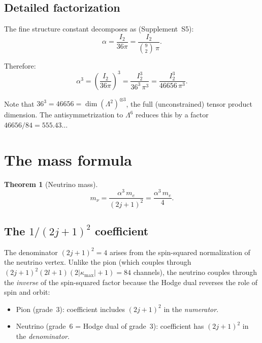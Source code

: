 \documentclass[11pt,letterpaper]{article}
\newtheorem{theorem}{Theorem}[section]
\numberwithin{equation}{section}
\begin{document}
\subsection{Detailed factorization}

The fine structure constant decomposes as (Supplement~S5):
\begin{equation}
  \alpha = \frac{I_2}{36\pi} = \frac{I_2}{\binom{9}{2}\,\pi}.
\end{equation}

Therefore:
\begin{equation}
\label{eq:alpha3}
  \alpha^3 = \left(\frac{I_2}{36\pi}\right)^3 = \frac{I_2^3}{36^3\,\pi^3}
  = \frac{I_2^3}{46656\,\pi^3}.
\end{equation}

Note that $36^3 = 46656 = \dim\left(\Lambda^2\right)^{\otimes 3}$, the full
(unconstrained) tensor product dimension. The antisymmetrization to
$\Lambda^6$ reduces this by a factor $46656/84 = 555.43\ldots$

\section{The mass formula}
\label{sec:mass_formula}

\begin{theorem}[Neutrino mass]
\label{thm:neutrino}
\begin{equation}
\label{eq:m_nu}
\boxed{
  m_\nu = \frac{\alpha^3\,m_e}{(2j+1)^2} = \frac{\alpha^3\,m_e}{4}.
}
\end{equation}
\end{theorem}

\subsection{The $1/(2j+1)^2$ coefficient}

The denominator $(2j+1)^2 = 4$ arises from the spin-squared normalization
of the neutrino vertex. Unlike the pion (which couples through
$(2j+1)^2(2l+1)(2|\kappa_\mathrm{max}|+1) = 84$ channels), the neutrino
couples through the \emph{inverse} of the spin-squared factor because the
Hodge dual reverses the role of spin and orbit:

\begin{itemize}
  \item Pion (grade~3): coefficient includes $(2j+1)^2$ in the \emph{numerator}.
  \item Neutrino (grade~6 = Hodge dual of grade~3): coefficient has
    $(2j+1)^2$ in the \emph{denominator}.
\end{itemize}
\end{document}
